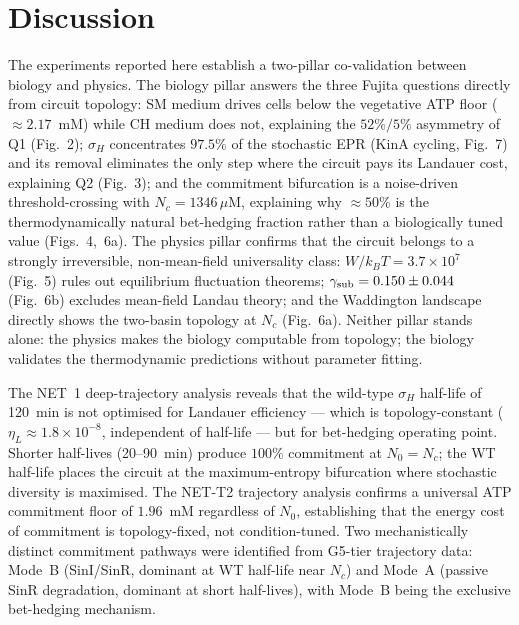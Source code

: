 \documentclass[11pt,a4paper]{article}
\begin{document}
\section{Discussion}
\label{sec:discussion}

The experiments reported here establish a two-pillar co-validation between
biology and physics.
The biology pillar answers the three Fujita questions directly from
circuit topology: SM medium drives cells below the vegetative ATP floor
($\approx 2.17$~mM) while CH medium does not, explaining the $52\%/5\%$
asymmetry of Q1 (Fig.~2); $\sigma_H$ concentrates $97.5\%$ of the
stochastic EPR (KinA cycling, Fig.~7) and its removal eliminates the only
step where the circuit pays its Landauer cost, explaining Q2 (Fig.~3);
and the commitment bifurcation is a noise-driven threshold-crossing with
$N_c = 1346\,\mu$M, explaining why $\approx 50\%$ is the thermodynamically
natural bet-hedging fraction rather than a biologically tuned value
(Figs.~4,~6a).
The physics pillar confirms that the circuit belongs to a strongly
irreversible, non-mean-field universality class: $W/k_BT = 3.7 \times 10^7$
(Fig.~5) rules out equilibrium fluctuation theorems; $\gamma_{\rm sub} =
0.150 \pm 0.044$ (Fig.~6b) excludes mean-field Landau theory; and the
Waddington landscape directly shows the two-basin topology at $N_c$ (Fig.~6a).
Neither pillar stands alone: the physics makes the biology computable from
topology; the biology validates the thermodynamic predictions without
parameter fitting.

The NET~1 deep-trajectory analysis reveals that the wild-type $\sigma_H$
half-life of 120~min is not optimised for Landauer efficiency — which is
topology-constant ($\eta_L \approx 1.8 \times 10^{-8}$, independent of
half-life — but for bet-hedging operating point.
Shorter half-lives (20–90~min) produce $100\%$ commitment at $N_0 = N_c$;
the WT half-life places the circuit at the maximum-entropy bifurcation
where stochastic diversity is maximised.
The NET-T2 trajectory analysis confirms a universal ATP commitment floor
of $1.96$~mM regardless of $N_0$, establishing that the energy cost of commitment
is topology-fixed, not condition-tuned.
Two mechanistically distinct commitment pathways were identified from
G5-tier trajectory data: Mode~B (SinI/SinR, dominant at WT half-life
near $N_c$) and Mode~A (passive SinR degradation, dominant at short
half-lives), with Mode~B being the exclusive bet-hedging mechanism.
\end{document}
